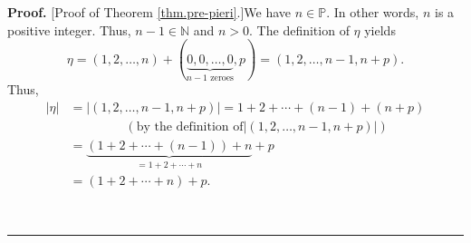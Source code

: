 \documentclass[numbers=enddot,12pt,final,onecolumn,notitlepage,english]{scrartcl}%
\theoremstyle{definition}
\newenvironment{proof}[1][Proof]{\noindent\textbf{#1.} }{\ \rule{0.5em}{0.5em}}
\newenvironment{verlong}{}{}
\begin{document}
\begin{verlong}
\begin{proof}
[Proof of Theorem \ref{thm.pre-pieri}.]We have $n\in\mathbb{P}$. In other
words, $n$ is a positive integer. Thus, $n-1\in\mathbb{N}$ and $n>0$. The
definition of $\eta$ yields%
\[
\eta=\left(  1,2,\ldots,n\right)  +\left(  \underbrace{0,0,\ldots
,0}_{n-1\text{ zeroes}},p\right)  =\left(  1,2,\ldots,n-1,n+p\right)  .
\]
Thus,%
\begin{align}
\left\vert \eta\right\vert  &  =\left\vert \left(  1,2,\ldots,n-1,n+p\right)
\right\vert =1+2+\cdots+\left(  n-1\right)  +\left(  n+p\right) \nonumber\\
&  \ \ \ \ \ \ \ \ \ \ \ \ \ \ \ \ \ \ \ \ \left(  \text{by the definition of
}\left\vert \left(  1,2,\ldots,n-1,n+p\right)  \right\vert \right) \nonumber\\
&  =\underbrace{\left(  1+2+\cdots+\left(  n-1\right)  \right)  +n}%
_{=1+2+\cdots+n}+p\nonumber\\
&  =\left(  1+2+\cdots+n\right)  +p. \label{pf.thm.pre-pieri.sum-eta}%
\end{align}



\end{proof}
\end{verlong}
\end{document}
